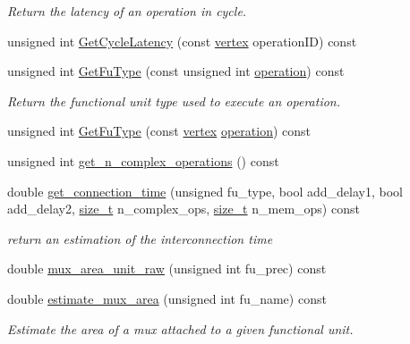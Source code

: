 \begin{DoxyCompactItemize}
\begin{DoxyCompactList}\small\item\em Return the latency of an operation in cycle. \end{DoxyCompactList}\item 
unsigned int \hyperlink{classAllocationInformation_aa2a901ccb4d9b6932dbd9ec2c89f2998}{Get\+Cycle\+Latency} (const \hyperlink{graph_8hpp_abefdcf0544e601805af44eca032cca14}{vertex} operation\+ID) const
\item 
unsigned int \hyperlink{classAllocationInformation_aa65644e624477a27fe4288d30b88e627}{Get\+Fu\+Type} (const unsigned int \hyperlink{structoperation}{operation}) const
\begin{DoxyCompactList}\small\item\em Return the functional unit type used to execute an operation. \end{DoxyCompactList}\item 
unsigned int \hyperlink{classAllocationInformation_aa0b3108baa944921bb25dbf1f5516245}{Get\+Fu\+Type} (const \hyperlink{graph_8hpp_abefdcf0544e601805af44eca032cca14}{vertex} \hyperlink{structoperation}{operation}) const
\item 
unsigned int \hyperlink{classAllocationInformation_a8468ee7208e4d231c58e7c82e4a8a9aa}{get\+\_\+n\+\_\+complex\+\_\+operations} () const
\item 
double \hyperlink{classAllocationInformation_a94969cbe8576878b499b71b87d4944f0}{get\+\_\+connection\+\_\+time} (unsigned fu\+\_\+type, bool add\+\_\+delay1, bool add\+\_\+delay2, \hyperlink{tutorial__fpt__2017_2intro_2sixth_2test_8c_a7c94ea6f8948649f8d181ae55911eeaf}{size\+\_\+t} n\+\_\+complex\+\_\+ops, \hyperlink{tutorial__fpt__2017_2intro_2sixth_2test_8c_a7c94ea6f8948649f8d181ae55911eeaf}{size\+\_\+t} n\+\_\+mem\+\_\+ops) const
\begin{DoxyCompactList}\small\item\em return an estimation of the interconnection time \end{DoxyCompactList}\item 
double \hyperlink{classAllocationInformation_a6a6237d060c2b4300ec143e945c61aff}{mux\+\_\+area\+\_\+unit\+\_\+raw} (unsigned int fu\+\_\+prec) const
\item 
double \hyperlink{classAllocationInformation_a2b709f9c79ac9504bd36620dd385ce50}{estimate\+\_\+mux\+\_\+area} (unsigned int fu\+\_\+name) const
\begin{DoxyCompactList}\small\item\em Estimate the area of a mux attached to a given functional unit. \end{DoxyCompactList}\item 

\end{DoxyCompactItemize}
